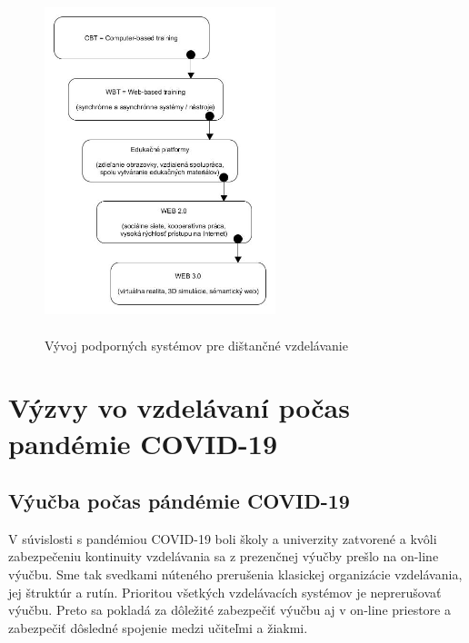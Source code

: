 \documentclass[10pt,oneside,slovak,a4paper]{article}
\begin{document}
\begin{figure}[]
	\centering
	\includegraphics[scale=0.15, height=100mm,width=0.6\textwidth]{Dev_Of_SupSys_DE.jpg}
	\caption{Vývoj podporných systémov pre dištančné vzdelávanie\cite{WiktorzakKotowski}}
	\label{Vyvoj_podp_sys_DE}
\end{figure}

\section{Výzvy vo vzdelávaní počas pandémie COVID-19}
\subsection{Výučba počas pándémie COVID-19} %
V súvislosti s pandémiou COVID-19 boli školy a univerzity zatvorené a kvôli zabezpečeniu kontinuity vzdelávania sa z prezenčnej výučby prešlo na on-line výučbu.
Sme tak svedkami núteného prerušenia klasickej organizácie vzdelávania, jej štruktúr a rutín. Prioritou všetkých vzdelávacích systémov je neprerušovať výučbu.
Preto sa pokladá za dôležité zabezpečiť výučbu aj v on-line priestore a zabezpečiť dôsledné spojenie medzi učiteľmi a žiakmi. 
\end{document}
